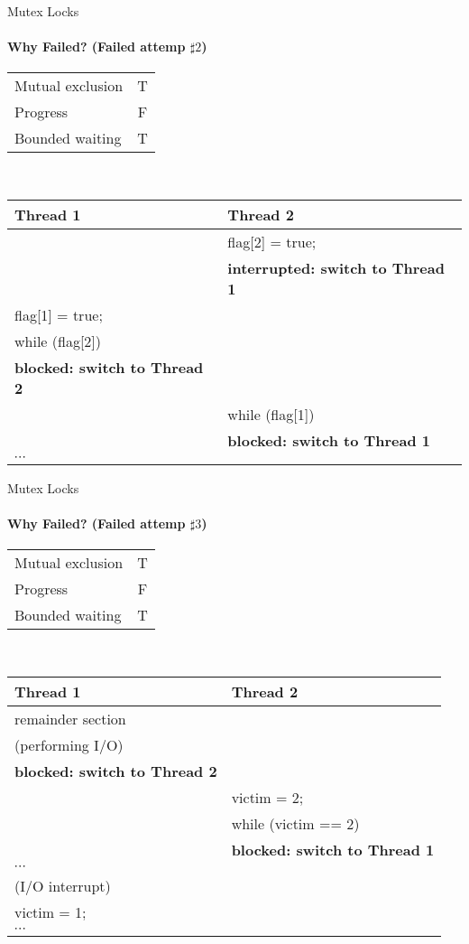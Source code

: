 \documentclass[10pt]{beamer}
\begin{document}
\begin{frame}{Mutex Locks}
\framesubtitle{Why Failed? (Failed attemp $\sharp 2$)}
\scriptsize
\begin{tabular}{|l|c|}
\hline
Mutual exclusion & T\\
Progress & F\\
Bounded waiting & T\\
\hline
\end{tabular}
\\
\vspace{2em}
\centering
\begin{tabular}{l l}
\textbf{Thread 1}&\textbf{Thread 2}\\
\hline
&flag[2] = true;\\
& \textbf{interrupted: switch to Thread 1}\\
flag[1] = true;&\\
while (flag[2]) &\\
\textbf{blocked: switch to Thread 2} &\\
& while (flag[1])\\
& \textbf{blocked: switch to Thread 1}\\
$\cdots$ &\\
\end{tabular}
\end{frame}

\begin{frame}{Mutex Locks}
\framesubtitle{Why Failed? (Failed attemp $\sharp 3$)}
\scriptsize
\begin{tabular}{|l|c|}
\hline
Mutual exclusion & T\\
Progress & F\\
Bounded waiting & T\\
\hline
\end{tabular}
\\
\vspace{2em}
\centering
\begin{tabular}{l l}
\textbf{Thread 1}&\textbf{Thread 2}\\
\hline
remainder section&\\
(performing I/O) &\\
\textbf{blocked: switch to Thread 2}&\\
&victim = 2;\\
&while (victim == 2) \\
&\textbf{blocked: switch to Thread 1}\\
$\cdots$ &\\
(I/O interrupt) &\\
victim = 1;&\\
$\cdots$ &\\
\end{tabular}
\end{frame}
\end{document}
